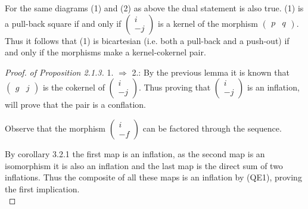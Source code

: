     \begin{corollary}
        For the same diagrams (1) and (2) as above the dual statement is also true. (1) is a pull-back square if and only if $\begin{pmatrix}
            i \\ -j
        \end{pmatrix}$ is a kernel of the morphism $\begin{pmatrix}
            p & q
        \end{pmatrix}$. Thus it follows that (1) is bicartesian (i.e. both a pull-back and a push-out) if and only if the morphisms make a kernel-cokernel pair.
    \end{corollary}

    \begin{proof}\emph{of Proposition 2.1.3.} 
        1. $\Rightarrow$ 2.: By the previous lemma it is known that $\begin{pmatrix}
            g & j
        \end{pmatrix}$ is the cokernel of $\begin{pmatrix}
            i \\ -j
        \end{pmatrix}$. Thus proving that $\begin{pmatrix}
            i \\ -j
        \end{pmatrix}$ is an inflation, will prove that the pair is a conflation. 
        
        Observe that the morphism $\begin{pmatrix}
            i \\ -f
        \end{pmatrix}$ can be factored through the sequence. 
        \begin{center}
        \end{center}
        By corollary 3.2.1 the first map is an inflation, as the second map is an isomorphism it is also an inflation and the last map is the direct sum of two inflations. Thus the composite of all these maps is an inflation by (QE1), proving the first implication. \\


\end{proof}
